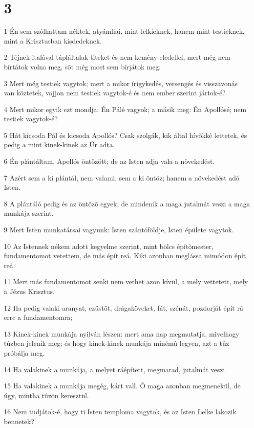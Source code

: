 \chapter{3}

\par 1 Én sem szólhattam néktek, atyámfiai, mint lelkieknek, hanem mint testieknek, mint a Krisztusban kisdedeknek.
\par 2 Téjnek italával tápláltalak titeket és nem kemény eledellel, mert még nem bírtátok volna meg, sõt még most sem bírjátok meg:
\par 3 Mert még testiek vagytok; mert a mikor írigykedés, versengés és visszavonás van köztetek, vajjon nem testiek vagytok-é és nem ember szerint jártok-é?
\par 4 Mert mikor egyik ezt mondja: Én Pálé vagyok; a másik meg: Én Apollósé; nem testiek vagytok-é?
\par 5 Hát kicsoda Pál és kicsoda Apollós? Csak szolgák, kik által hívõkké lettetek, és pedig a mint kinek-kinek az Úr adta.
\par 6 Én plántáltam, Apollós öntözött; de  az Isten adja vala a növekedést.
\par 7 Azért sem a ki plántál, nem valami, sem a ki öntöz; hanem a növekedést adó Isten.
\par 8 A plántáló pedig és az öntözõ egyek; de mindenik a maga jutalmát veszi a maga munkája szerint.
\par 9 Mert Isten munkatársai vagyunk: Isten szántóföldje, Isten  épülete vagytok.
\par 10 Az Istennek nékem adott kegyelme szerint, mint bölcs építõmester, fundamentomot  vetettem, de más épít reá. Kiki azonban meglássa mimódon épít reá.
\par 11 Mert más fundamentomot senki nem vethet azon kívül, a mely vettetett, mely a Jézus Krisztus.
\par 12 Ha pedig valaki aranyat, ezüstöt, drágaköveket, fát, szénát, pozdorját épít rá erre a fundamentomra;
\par 13 Kinek-kinek munkája nyilván lészen: mert ama nap megmutatja, mivelhogy tûzben jelenik meg; és hogy kinek-kinek munkája minémû legyen, azt a tûz próbálja meg.
\par 14 Ha valakinek a munkája, a melyet ráépített, megmarad, jutalmát veszi.
\par 15 Ha valakinek a munkája megég, kárt vall. Õ maga azonban megmenekül, de úgy, mintha tûzön keresztül.
\par 16 Nem tudjátok-é, hogy ti Isten temploma vagytok, és az Isten Lelke  lakozik bennetek?
